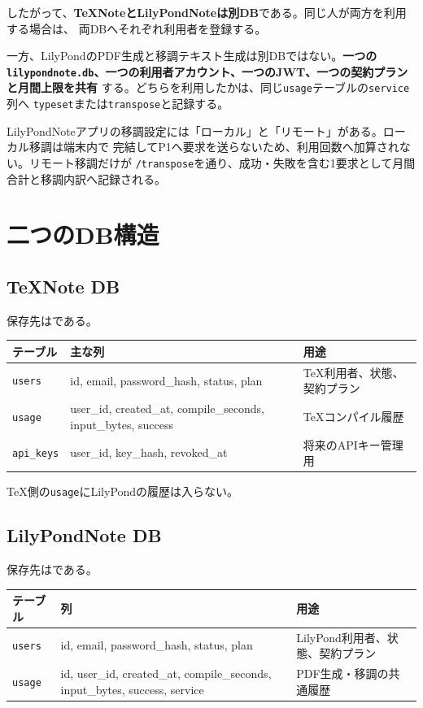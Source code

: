 \documentclass[uplatex,a4paper,11pt]{jsarticle}
\begin{document}
したがって、\textbf{TeXNoteとLilyPondNoteは別DB}である。同じ人が両方を利用する場合は、
両DBへそれぞれ利用者を登録する。

一方、LilyPondのPDF生成と移調テキスト生成は別DBではない。\textbf{一つの
\texttt{lilypondnote.db}、一つの利用者アカウント、一つのJWT、一つの契約プランと月間上限を共有}
する。どちらを利用したかは、同じ\texttt{usage}テーブルの\texttt{service}列へ
\texttt{typeset}または\texttt{transpose}と記録する。

LilyPondNoteアプリの移調設定には「ローカル」と「リモート」がある。ローカル移調は端末内で
完結してP1へ要求を送らないため、利用回数へ加算されない。リモート移調だけが
\texttt{/transpose}を通り、成功・失敗を含む1要求として月間合計と移調内訳へ記録される。

\section{二つのDB構造}

\subsection{TeXNote DB}

保存先はである。

\begin{longtable}{@{}p{28mm}p{46mm}p{72mm}@{}}
\toprule
テーブル & 主な列 & 用途\\
\midrule
\texttt{users} & id, email, password\_hash, status, plan & TeX利用者、状態、契約プラン\\
\texttt{usage} & user\_id, created\_at, compile\_seconds, input\_bytes, success & TeXコンパイル履歴\\
\texttt{api\_keys} & user\_id, key\_hash, revoked\_at & 将来のAPIキー管理用\\
\bottomrule
\end{longtable}

TeX側の\texttt{usage}にLilyPondの履歴は入らない。

\subsection{LilyPondNote DB}

保存先はである。

\begin{longtable}{@{}p{28mm}p{49mm}p{69mm}@{}}
\toprule
テーブル & 列 & 用途\\
\midrule
\texttt{users} & id, email, password\_hash, status, plan & LilyPond利用者、状態、契約プラン\\
\texttt{usage} & id, user\_id, created\_at, compile\_seconds, input\_bytes, success, service & PDF生成・移調の共通履歴\\
\bottomrule
\end{longtable}
\end{document}
